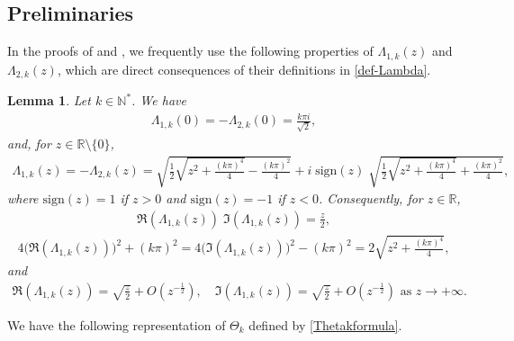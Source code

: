 \documentclass[11pt, reqno]{amsart}
\theoremstyle{plain}
\newtheorem{lemma}[thm]{Lemma}
\numberwithin{equation}{section}
\newcommand{\mR}{\mathbb{R}}
\begin{document}
\subsection{Preliminaries} \label{sect-Pre}

In the proofs of  and , we frequently use the following properties of $\Lambda_{1,k}(z)$ and $\Lambda_{2,k}(z)$, which are direct consequences of their definitions in \eqref{def-Lambda}.  


\begin{lemma} \label{formulaforlambda}
Let $k \in \mathbb{N}^*$. We have
\begin{align} 	\label{Lamdaat0}  
\Lambda_{1,k}(0) = - \Lambda_{2,k}(0) = \displaystyle \frac{k \pi i}{\sqrt{2}},
\end{align}
and, for $z \in \mathbb{R} \setminus \{0\}$, 
\begin{align}
\label{sqroot}
    \Lambda_{1,k}(z) = - \Lambda_{2,k}(z) = \sqrt{\frac{1}{2}\sqrt{z^2 + \frac{(k \pi)^4}{4} } - \frac{(k \pi)^2}{4} } + i \; \mathrm{sign}(z) \; \sqrt{\frac{1}{2}\sqrt{z^2 + \frac{(k \pi)^4}{4}} + \frac{(k \pi)^2}{4}},
\end{align}  
where $\mathrm{sign}(z) = 1$  if $z > 0$ and $\mathrm{sign}(z) = -1$ if $z < 0$. Consequently, for  $z \in \mR$, 
 	\begin{align} \label{rexim}
 		\Re (\Lambda_{1,k}(z)) \; \Im (\Lambda_{1,k}(z)) = \frac{z}{2}, 
 	\end{align}
\begin{align}	\label{reim2}
	4 \Big(\Re(\Lambda_{1,k}(z)) \Big)^2 + (k \pi)^2 = 4 \Big( \Im (\Lambda_{1,k}(z)) \Big)^2 - (k \pi)^2 = 2 \sqrt{z^2 + \frac{(k \pi)^4}{4}}, 
\end{align} 	
and
\begin{align}	\label{behavereim}
\Re (\Lambda_{1,k} (z)) = \sqrt{\frac{z}{2}} + O\left(z^{-\frac{1}{2}} \right), \quad \Im (\Lambda_{1,k} (z)) = \sqrt{\frac{z}{2}} + O \left(z^{-\frac{1}{2}} \right) \mbox{ as }  z \to +\infty.
\end{align} 
\end{lemma}


We have the following representation of $\Theta_k$ defined by \eqref{Thetakformula}. 
\end{document}

